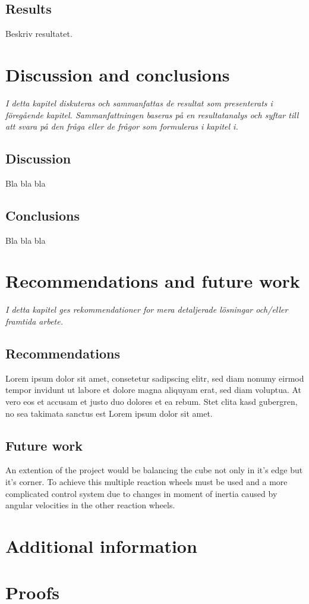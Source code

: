 \documentclass[a4paper,11pt]{kth-mag}
\begin{document}
\section{Results}
Beskriv resultatet.


\chapter{Discussion and conclusions}
\emph{I detta kapitel diskuteras och sammanfattas de resultat som presenterats i föregående kapitel. Sammanfattningen baseras på en resultatanalys och syftar till att svara på den fråga eller de frågor som formuleras i kapitel i.}

\section{Discussion}
Bla bla bla

\section{Conclusions}
Bla bla bla


\chapter{Recommendations and future work}
\emph{I detta kapitel ges rekommendationer for mera detaljerade lösningar och/eller framtida arbete.}

\section{Recommendations}
Lorem ipsum dolor sit amet, consetetur sadipscing elitr, sed diam nonumy eirmod tempor invidunt ut labore et dolore magna aliquyam erat, sed diam voluptua. At vero eos et accusam et justo duo dolores et ea rebum. Stet clita kasd gubergren, no sea takimata sanctus est Lorem ipsum dolor sit amet.

\section{Future work}
An extention of the project would be balancing the cube not only in it's edge but it's corner. To achieve this multiple reaction wheels must be used and a more complicated control system due to changes in moment of inertia caused by angular velocities in the other reaction wheels.

%
\cleardoublepage



\cleardoublepage
\appendix
{}


\chapter{Additional information} \label{appA}

\chapter{Proofs} \label{appB}

\cleardoublepage   
\cleartoverso %
%
\end{document}
